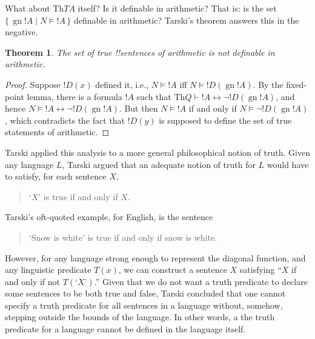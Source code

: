 \documentclass[10pt,a4paper]{article}
\theoremstyle{plain}
\newtheorem{thm}{Theorem}[section]
\theoremstyle{definition}
\theoremstyle{remark}
\newcommand*{\ollabel}[1]{\label{#1}}
\providecommand{\Proves}{\mathrel{\vdash}}
\providecommand{\Sat}[2]{\ensuremath{#1 \models #2}}
\providecommand{\Th}{\ensuremath{\mathrm{Th}}}
\providecommand{\Setabs}[2]{\{\, #1 \mid #2 \,\}}
\providecommand{\Gn}{\operatorname{gn}}
\providecommand{\gn}{\operatorname{gn}}
\providecommand{\liff}{\mathbin{\leftrightarrow}}
\begin{document}
What about $\Th{TA}$ itself? Is it definable in arithmetic? That
is: is the set $\Setabs{\Gn{!A}}{\Sat{N}{!A}}$ definable in
arithmetic? Tarski's theorem answers this in the negative.

\begin{thm}
\ollabel{thm:tarski}
The set of true !!{sentence}s of arithmetic is not definable in arithmetic.
\end{thm}

\begin{proof} 
Suppose $!D(x)$ defined it, i.e., $\Sat{N}{!A}$ iff
$\Sat{N}{!D(\gn{!A})}$. By the fixed-point lemma, there is a formula
$!A$ such that $\Th{Q} \Proves !A \liff \lnot !D(\gn{!A})$, and hence
$\Sat{N}{!A \liff \lnot !D(\gn{!A})}$. But then $\Sat{N}{!A}$ if and
only if $\Sat{N}{\lnot !D(\gn{!A})}$, which contradicts the fact that
$!D(y)$ is supposed to define the set of true statements of
arithmetic.  
\end{proof}

Tarski applied this analysis to a more general philosophical notion of
truth. Given any language $L$, Tarski argued that an adequate notion
of truth for $L$ would have to satisfy, for each sentence $X$,
\begin{quote}
`$X$' is true if and only if $X$.
\end{quote}
Tarski's oft-quoted example, for English, is the sentence
\begin{quote}
`Snow is white' is true if and only if snow is white.
\end{quote}
However, for any language strong enough to represent the diagonal
function, and any linguistic predicate $T(x)$, we can construct a
sentence $X$ satisfying ``$X$ if and only if not $T(\text{`$X$'})$.''
Given that we do not want a truth predicate to declare some sentences
to be both true and false, Tarski concluded that one cannot specify a
truth predicate for all sentences in a language without, somehow,
stepping outside the bounds of the language. In other words, a the
truth predicate for a language cannot be defined in the language
itself.
\end{document}
